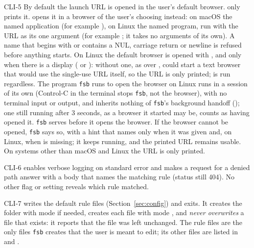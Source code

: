 \begin{req}{CLI-5}
By default the launch URL is opened in the user's default browser.  
only prints it.   opens it in a browser of the user's choosing
instead: on macOS the named application (for example ), on
Linux the named program, run with the URL as its one argument (for example
; it takes no arguments of its own).  A name that begins with \code{-}
or contains a NUL, carriage return or newline is refused before anything starts.
On Linux the default browser is opened with , and only when there is
a display ( or ): without one, as over
,  could start a text browser that would use the
single-use URL itself, so the URL is only printed;  is run
regardless.  The program \texttt{fsb} runs to open the browser on Linux runs in a
session of its own (Control-C in the terminal stops \texttt{fsb}, not the browser),
with no terminal input or output, and inherits nothing of \texttt{fsb}'s
background handoff (); one still running after 3 seconds, as a browser
it started may be, counts as having opened it.  \texttt{fsb} serves before it opens
the browser.  If the browser cannot be opened, \texttt{fsb} says so, with a hint
that names  only when it was given and, on Linux, 
when  is missing; it keeps running, and the printed URL remains
usable.  On systems other than macOS and Linux the URL is only printed.
\end{req}

\begin{req}{CLI-6}
 enables verbose logging on standard error and makes a request for a
denied path answer with a body that names the matching rule (status still 404).  No
other flag or setting reveals which rule matched.
\end{req}

\begin{req}{CLI-7}
 writes the default rule files (Section~\ref{sec:config}) and exits.  It
creates the folder  with mode  if needed, creates each
file with mode , and \emph{never overwrites} a file that exists: it reports
that the file was left unchanged.  The rule files are the only files \texttt{fsb}
creates that the user is meant to edit; its other files are listed in 
and .
\end{req}

